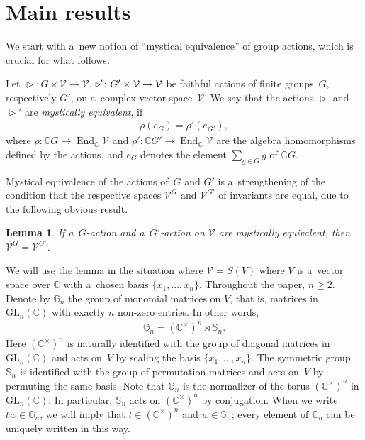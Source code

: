 \documentclass[11pt]{article}
\DeclareMathOperator{\End}{End}
\newtheorem{Lemma}[Theorem]{Lemma}
\begin{document}
\section{Main results}
\label{sect:main}

We start with a~new notion of ``mystical equivalence'' of group actions, which is crucial for what follows.

\begin{Definition}
Let $ \mathop{\triangleright}\nolimits\colon G \times \mathcal V\to \mathcal V$,
$\mathop{\triangleright}\nolimits\nolimits'\colon G' \times \mathcal V\to \mathcal V $ be faithful actions of f\/inite
groups~$G$, respectively $G'$, on a~complex vector space~$\mathcal V$.
We say that the actions $\mathop{\triangleright}\nolimits$ and $\mathop{\triangleright}\nolimits'$ are
\textit{mystically equivalent}, if
\begin{gather*}
\rho(e_G)=\rho'(e_{G'}),
\end{gather*}
where $\rho\colon \mathbb C G \to \End_\mathbb C \mathcal V$ and $\rho'\colon \mathbb C G'\to \End_\mathbb C\mathcal V$
are the algebra homomorphisms def\/ined by the actions, and $e_G$ denotes the element $\sum\limits_{g\in G}g$ of $\mathbb C G$.
\end{Definition}

Mystical equivalence of the actions of~$G$ and $G'$ is a~strengthening of the condition that the respective spaces
$\mathcal V^G$ and $\mathcal V^{G'}$ of invariants are equal, due to the following obvious result.
\begin{Lemma}%
If a~$G$-action and a~$G'$-action on $\mathcal V$ are mystically equivalent, then $\mathcal V^G=\mathcal V^{G'}$.
\end{Lemma}

We will use the lemma in the situation where $\mathcal V = S(V)$ where $V$ is a~vector space over $\mathbb C$ with
a~chosen basis $\{x_1,\ldots,x_n\}$.
Throughout the paper, $n\ge 2$.
Denote by $\mathbb G_n$ the group of monomial matrices on $V$, that is, matrices in $\mathrm{GL}_n(\mathbb C)$ with
exactly $n$ non-zero entries.
In other words,
\begin{gather*}
\mathbb G_n=(\mathbb C^\times)^n\rtimes \mathbb S_n.
\end{gather*}
Here $(\mathbb C^\times)^n$ is naturally identif\/ied with the group of diagonal matrices in $\mathrm{GL}_n(\mathbb C)$
and acts on~$V$ by scaling the basis $\{x_1,\ldots,x_n\}$.
The symmetric group $\mathbb S_n$ is identif\/ied with the group of permutation matrices and acts on~$V$ by permuting the
same basis.
Note that $\mathbb G_n$ is the normalizer of the torus $(\mathbb C^\times)^n$ in $\mathrm{GL}_n(\mathbb C)$.
In particular, $\mathbb S_n$ acts on $(\mathbb C^\times)^n$ by conjugation.
When we write $tw\in \mathbb G_n$, we will imply that $t\in (\mathbb C^\times)^n$ and $w\in \mathbb S_n$; every element
of $\mathbb G_n$ can be uniquely written in this way.
\end{document}
